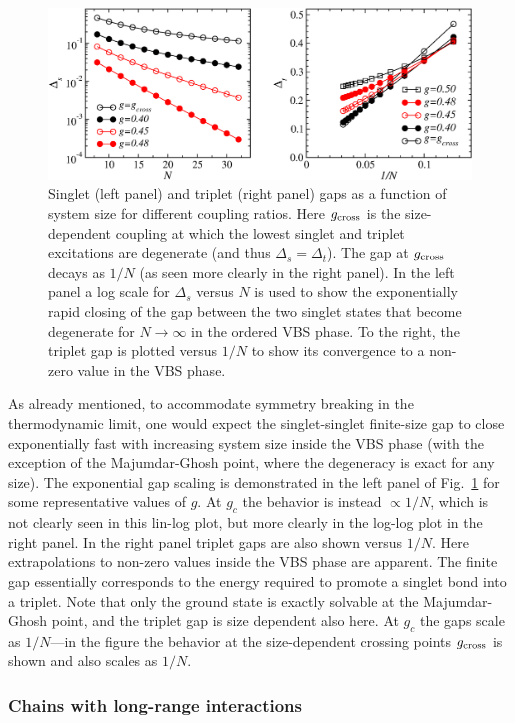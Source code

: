 \documentclass[draft,numberedheadings]{aipproc}
\begin{document}
\begin{figure}
\includegraphics[width=13cm, clip]{stgaps.eps}
\caption{Singlet (left panel) and triplet (right panel) gaps as a function of system size for different coupling ratios. Here $g_{\rm cross}$ is the
size-dependent coupling at which the lowest singlet and triplet excitations are degenerate (and thus $\Delta_s=\Delta_t$). The gap at $g_{\rm cross}$ decays as 
$1/N$ (as seen more clearly in the right panel). In the left panel a log scale for $\Delta_s$ versus $N$ is used to show the exponentially rapid closing of the 
gap between the two singlet states that become degenerate for $N\to \infty$ in the ordered VBS phase.  To the right, the triplet gap is plotted 
versus $1/N$ to show its convergence to a non-zero value in the VBS phase.}
\label{stgaps}
\end{figure}

As already mentioned, to accommodate symmetry breaking in the thermodynamic limit, one would expect the singlet-singlet finite-size gap to close exponentially 
fast with increasing system size inside the VBS phase (with the exception of the Majumdar-Ghosh point, where the degeneracy is exact for any size). The exponential 
gap scaling is demonstrated in the left panel of Fig.~\ref{stgaps} for some representative values of $g$. At $g_c$ the behavior is instead $\propto 1/N$, which 
is not clearly seen in this lin-log plot, but more clearly in the log-log plot in the right panel. In the right panel triplet gaps are also shown versus $1/N$. 
Here extrapolations to non-zero values inside the VBS phase are apparent. The finite gap essentially corresponds to the energy required to promote a singlet 
bond into a triplet. Note that only the ground state is exactly solvable at the Majumdar-Ghosh point, and the triplet gap is size dependent also here. At 
$g_c$ the gaps scale as $1/N$---in the figure the behavior at the size-dependent crossing points $g_{\rm cross}$ is shown and also scales as $1/N$.

\subsubsection{Chains with long-range interactions}
\label{sec_longrange}
\end{document}
